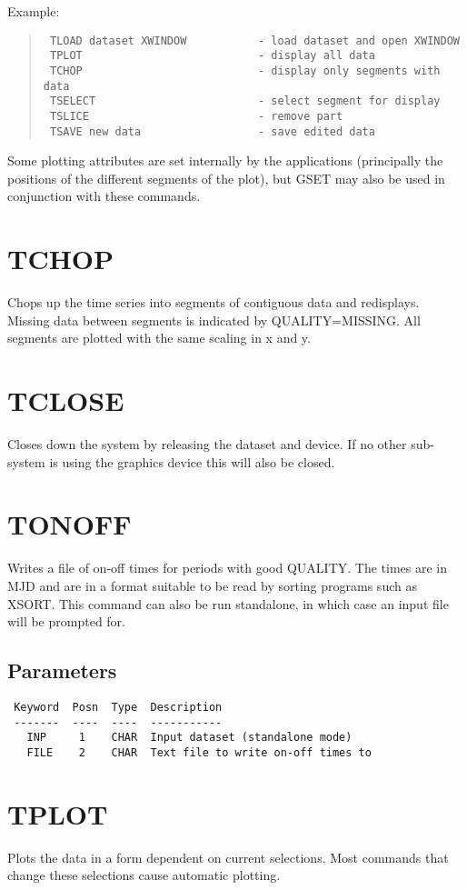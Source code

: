 \documentclass{book}
\renewcommand{\_}{{\tt\char'137}}     %
\begin{document}
Example:
\begin{quote}\begin{verbatim}
 TLOAD dataset XWINDOW           - load dataset and open XWINDOW
 TPLOT                           - display all data
 TCHOP                           - display only segments with data
 TSELECT                         - select segment for display
 TSLICE                          - remove part
 TSAVE new data                  - save edited data
\end{verbatim}\end{quote}
Some plotting attributes are set internally by the applications
(principally the positions of the different segments of the plot),
but GSET may also be used in conjunction with these commands.

\section{TCHOP}
Chops up the time series into segments of contiguous data and
redisplays. Missing data between segments is indicated by
QUALITY=MISSING. All segments are plotted with the same scaling
in x and y.

\section{TCLOSE}
Closes down the system by releasing the dataset and device.
If no other sub-system is using the graphics device this will
also be closed.

\section{TONOFF}
Writes a file of on-off times for periods with good QUALITY.
The times are in MJD and are in a format suitable to be read
by sorting programs such as XSORT. This command can also
be run standalone, in which case an input file will be
prompted for.

\subsection{Parameters}
\begin{verbatim}
 Keyword  Posn  Type  Description
 -------  ----  ----  -----------
   INP     1    CHAR  Input dataset (standalone mode)
   FILE    2    CHAR  Text file to write on-off times to

\end{verbatim}\section{TPLOT}
Plots the data in a form dependent on current selections.
Most commands that change these selections cause automatic
plotting.
\end{document}
